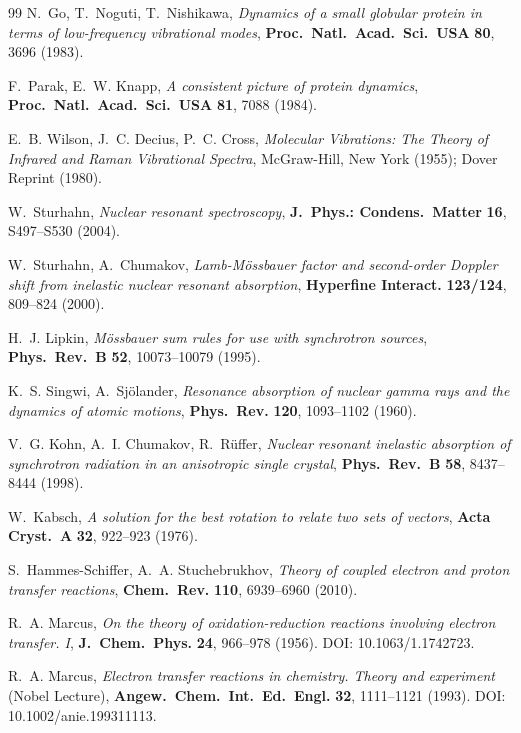 \documentclass[11pt,a4paper,twoside]{article}
\theoremstyle{remark}
\begin{document}
\begin{thebibliography}{99}
N.~Go, T.~Noguti, T.~Nishikawa,
\emph{Dynamics of a small globular protein in terms of low-frequency
vibrational modes},
\textbf{Proc.\ Natl.\ Acad.\ Sci.\ USA} \textbf{80}, 3696 (1983).

F.~Parak, E.~W. Knapp,
\emph{A consistent picture of protein dynamics},
\textbf{Proc.\ Natl.\ Acad.\ Sci.\ USA} \textbf{81}, 7088 (1984).

E.~B. Wilson, J.~C. Decius, P.~C. Cross,
\emph{Molecular Vibrations: The Theory of Infrared and Raman
Vibrational Spectra},
McGraw-Hill, New York (1955); Dover Reprint (1980).

W.~Sturhahn,
\emph{Nuclear resonant spectroscopy},
\textbf{J.\ Phys.: Condens.\ Matter} \textbf{16}, S497--S530 (2004).

W.~Sturhahn, A.~Chumakov,
\emph{Lamb-M\"ossbauer factor and second-order Doppler shift from
inelastic nuclear resonant absorption},
\textbf{Hyperfine Interact.} \textbf{123/124}, 809--824 (2000).

H.~J. Lipkin,
\emph{M\"ossbauer sum rules for use with synchrotron sources},
\textbf{Phys.\ Rev.\ B} \textbf{52}, 10073--10079 (1995).

K.~S. Singwi, A.~Sj\"olander,
\emph{Resonance absorption of nuclear gamma rays and the dynamics of
atomic motions},
\textbf{Phys.\ Rev.} \textbf{120}, 1093--1102 (1960).

V.~G. Kohn, A.~I. Chumakov, R.~R\"uffer,
\emph{Nuclear resonant inelastic absorption of synchrotron radiation
in an anisotropic single crystal},
\textbf{Phys.\ Rev.\ B} \textbf{58}, 8437--8444 (1998).

W.~Kabsch,
\emph{A solution for the best rotation to relate two sets of vectors},
\textbf{Acta Cryst.\ A} \textbf{32}, 922--923 (1976).

S.~Hammes-Schiffer, A.~A. Stuchebrukhov,
\emph{Theory of coupled electron and proton transfer reactions},
\textbf{Chem.\ Rev.} \textbf{110}, 6939--6960 (2010).

R.~A. Marcus,
\emph{On the theory of oxidation-reduction reactions involving
electron transfer. I},
\textbf{J.\ Chem.\ Phys.} \textbf{24}, 966--978 (1956).
DOI: 10.1063/1.1742723.

R.~A. Marcus,
\emph{Electron transfer reactions in chemistry. Theory and experiment}
(Nobel Lecture),
\textbf{Angew.\ Chem.\ Int.\ Ed.\ Engl.} \textbf{32}, 1111--1121 (1993).
DOI: 10.1002/anie.199311113.


\end{thebibliography}
\end{document}
